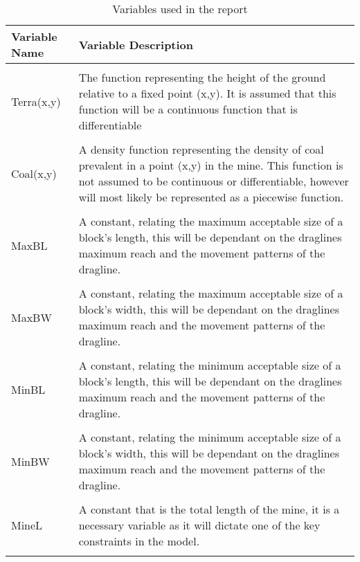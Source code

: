 \documentclass[12pt, openany, a4paper]{book}
\begin{document}
	\begin{table}[h!]
	\centering
	\caption{Variables used in the report}
	\begin{tabular}{p{5cm} p{11cm}}
		\textbf{Variable Name} & \textbf{Variable Description}\\ \hline  \\ 
		Terra(x,y) & The function representing the height of the ground relative to a fixed point (x,y). It is assumed that this function will be a continuous function that is differentiable \\ \hline \\ 
		Coal(x,y) & A density function representing the density of coal prevalent in a point (x,y) in the mine. This function is not assumed to be continuous or differentiable, however will most likely be represented as a piecewise function.
		\\ \hline \\
		MaxBL & A constant, relating the maximum acceptable size of a block's length, this will be dependant on the draglines maximum reach and the movement patterns of the dragline.
		\\ \hline \\ 
		MaxBW &  A constant, relating the maximum acceptable size of a block's width, this will be dependant on the draglines maximum reach and the movement patterns of the dragline.
		\\ \hline \\ 
		MinBL &  A constant, relating the minimum acceptable size of a block's length, this will be dependant on the draglines maximum reach and the movement patterns of the dragline.
		\\ \hline \\  
		MinBW &  A constant, relating the minimum acceptable size of a block's width, this will be dependant on the draglines maximum reach and the movement patterns of the dragline. \\ \hline \\
		MineL & A constant that is the total length of the mine, it is a necessary variable as it will dictate one of the key constraints in the model. \\ \hline \\
		\end{tabular}
		\end{table}
\end{document}
